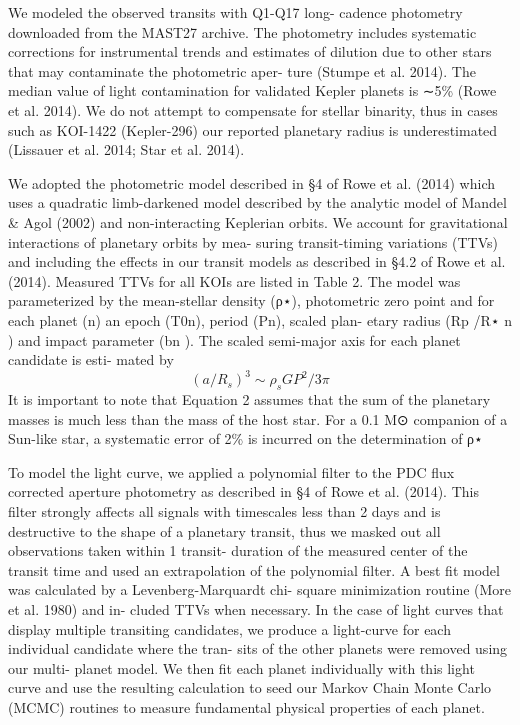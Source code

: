 

We modeled the observed transits with Q1-Q17 long- cadence photometry downloaded from the
MAST27 archive. The photometry includes systematic corrections for instrumental trends and
estimates of dilution due to other stars that may contaminate the photometric aper- ture
(Stumpe et al. 2014). The median value of light contamination for validated Kepler planets
is ∼5\% (Rowe et al. 2014).
We do not attempt to compensate for stellar binarity,
thus in cases such as KOI-1422 (Kepler-296) our reported planetary radius is
underestimated (Lissauer et al. 2014; Star et al. 2014).

We adopted the photometric model described in §4 of Rowe et al. (2014)
which uses a quadratic limb-darkened model described by the analytic
model of Mandel & Agol (2002) and non-interacting Keplerian orbits.
We account for gravitational interactions of planetary orbits by mea- suring
transit-timing variations (TTVs) and including the effects in our transit models as
described in §4.2 of Rowe et al. (2014). Measured TTVs for all KOIs are listed in Table 2.
The model was parameterized by the mean-stellar density (ρ⋆),
photometric zero point and for each planet (n) an epoch (T0n), period (Pn),
scaled plan- etary radius (Rp /R⋆ n ) and impact parameter (bn ).
The scaled semi-major axis for each planet candidate is esti- mated by
$$(a/R_s)^3 \sim \rho_s GP^2 / 3\pi$$
It is important to note that Equation 2 assumes that the sum of the planetary masses
is much less than the mass of the host star. For a 0.1 M⊙ companion of a Sun-like star,
a systematic error of 2\% is incurred on the determination of ρ⋆

To model the light curve, we applied a polynomial filter to the PDC
flux corrected aperture photometry as described in §4 of Rowe et al. (2014).
This filter strongly affects all signals with timescales less than 2 days and is
destructive to the shape of a planetary transit, thus we masked out all observations
taken within 1 transit- duration of the measured center of the transit time and used
an extrapolation of the polynomial filter. A best fit model was calculated by a
Levenberg-Marquardt chi- square minimization routine (More et al. 1980) and in- cluded
TTVs when necessary. In the case of light curves that display multiple transiting candidates,
we produce a light-curve for each individual candidate where the tran- sits of the
other planets were removed using our multi- planet model.
We then fit each planet individually with this light curve and use the resulting
calculation to seed our Markov Chain Monte Carlo (MCMC) routines to measure fundamental
physical properties of each planet.


